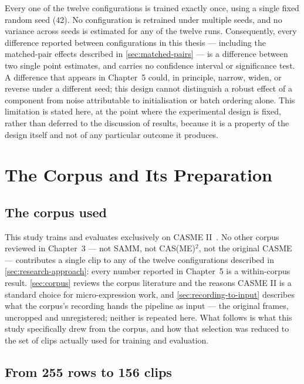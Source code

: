 Every one of the twelve configurations is trained exactly once, using a single fixed random seed (42). No configuration is retrained under multiple seeds, and no variance across seeds is estimated for any of the twelve runs. Consequently, every difference reported between configurations in this thesis --- including the matched-pair effects described in \autoref{sec:matched-pairs} --- is a difference between two single point estimates, and carries no confidence interval or significance test. A difference that appears in Chapter~5 could, in principle, narrow, widen, or reverse under a different seed; this design cannot distinguish a robust effect of a component from noise attributable to initialisation or batch ordering alone. This limitation is stated here, at the point where the experimental design is fixed, rather than deferred to the discussion of results, because it is a property of the design itself and not of any particular outcome it produces.


\section{The Corpus and Its Preparation}
\label{sec:corpus-preparation}

\subsection{The corpus used}
\label{sec:corpus-used}

This study trains and evaluates exclusively on CASME II~\cite{yan2014}. No other corpus reviewed in Chapter~3 --- not SAMM, not CAS(ME)$^2$, not the original CASME --- contributes a single clip to any of the twelve configurations described in \autoref{sec:research-approach}: every number reported in Chapter~5 is a within-corpus result. \autoref{sec:corpus} reviews the corpus literature and the reasons CASME II is a standard choice for micro-expression work, and \autoref{sec:recording-to-input} describes what the corpus's recording hands the pipeline as input --- the original frames, uncropped and unregistered; neither is repeated here. What follows is what this study specifically drew from the corpus, and how that selection was reduced to the set of clips actually used for training and evaluation.

\subsection{From 255 rows to 156 clips}
\label{sec:255-to-156}

